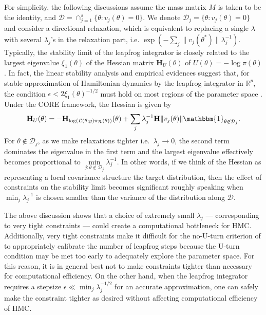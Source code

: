 \documentclass[10pt,fleqn]{article}
\newcommand{\bb}[1]{\mathbb{#1}} \newcommand{\mc}[1]{\mathcal{#1}}
\DeclareMathOperator{\1}{\mathbbm{1}} \DeclareMathOperator{\bigO}{\mc O}
\newcommand{\dt}{\epsilon} %
\newcommand{\mass}{M} %
\newcommand{\hess}{\mathbf{H}} %
\begin{document}
For simplicity, the following discussions assume the mass matrix $\mass$ is
taken to be the identity, and $\mc D= \cap_{j=1}^s\{\theta :v_j(\theta)=0 \}$.
We denote $\mc D_j= \{\theta :v_j(\theta)=0 \}$ and consider a directional
relaxation, which is equivalent to replacing a single $\lambda$ with several
$\lambda_j$'s in the relaxation part, i.e. $\exp(-\sum_j{\|v_j(\theta^*)\|}{\lambda_j^{-1}})$. 
Typically, the stability limit of the leapfrog integrator is closely related to the largest
eigenvalue $\xi_1(\theta)$ of the Hessian matrix $\hess_U(\theta)$ of
$U(\theta) = - \log \pi(\theta)$. In fact, the linear stability analysis and
empirical evidences suggest that, for stable approximation of Hamiltonian
dynamics by the leapfrog integrator in $\bb R^p$, the condition $\dt <
2\xi_1(\theta)^{-1/2}$ must hold on most regions of the parameter space
\citep{hairer06}. Under the CORE framework, the Hessian is given by 
\begin{equation} \label{eq:hessian_extrinsic}
\hess_U(\theta) = -\hess_{\log
(\mathcal L(\theta;y) \pi_{\mc R}(\theta))
}(\theta)+\sum_j \lambda_j^{-1} \hess {\|v_j(\theta)\|}
\mathbbm{1}_{\theta\not\in \mc D_j}. \end{equation}
For ${\theta\not\in \mc D_j}$, as we make relaxations tighter i.e.\ $\lambda^{}_j \to 0$, the second term dominates the eigenvalue in the first term and the largest eigenvalue effectively becomes
proportional to $ \underset{j: \theta \not\in \mc D_j}{\min}\lambda_j^{-1}$. In other words, if we think of the Hessian as representing a local covariance structure the target distribution, then the effect of constraints on the stability limit becomes significant roughly speaking when $\min_j \lambda_j^{-1}$ is chosen smaller than the variance of the distribution along ${\mc D}$. 

The above discussion shows that a choice of extremely small $\lambda_j$ --- corresponding to very tight constraints --- could create a computational bottleneck for HMC. Additionally, very tight constraints make it difficult for the no-U-turn criterion of \cite{hoffman2014no} to appropriately calibrate the number of leapfrog steps because the U-turn condition may be met too early to adequately explore the parameter space. For this reason, it is in general best not to make constraints tighter than necessary for computational efficiency. On the other hand, when the leapfrog integrator requires a stepsize $\epsilon \ll \min_j \lambda_j^{-1 / 2}$ for an accurate approximation, one can safely make the constraint tighter as desired without affecting computational efficiency of HMC. 
\end{document}
